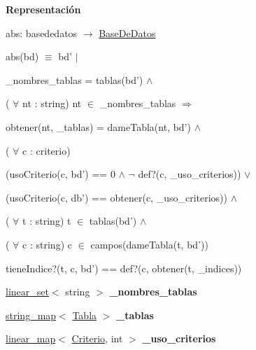 \begin{Indent}{\bf Representación}
{abs\-: basededatos $\to$ \hyperlink{classBaseDeDatos}{Base\-De\-Datos}\par
abs(bd) $\equiv$ bd' $|$
\begin{DoxyItemize}
\item \-\_\-nombres\-\_\-tablas = tablas(bd') $\land$
\item ( $\forall$ nt \-: string) nt $\in$ \-\_\-nombres\-\_\-tablas $\Rightarrow$
\begin{DoxyItemize}
\item obtener(nt, \-\_\-tablas) = dame\-Tabla(nt, bd') $\land$
\end{DoxyItemize}
\item ( $\forall$ c \-: criterio)
\begin{DoxyItemize}
\item (uso\-Criterio(c, bd') == 0 $\land$ $\lnot$ def?(c, \-\_\-uso\-\_\-criterios)) $\lor$
\item (uso\-Criterio(c, db') == obtener(c, \-\_\-uso\-\_\-criterios)) $\land$
\end{DoxyItemize}
\item ( $\forall$ t \-: string) t $\in$ tablas(bd') $\land$
\item ( $\forall$ c \-: string) c $\in$ campos(dame\-Tabla(t, bd'))
\begin{DoxyItemize}
\item tiene\-Indice?(t, c, bd') == def?(c, obtener(t, \-\_\-indices)) 
\end{DoxyItemize}
\end{DoxyItemize}}\begin{DoxyCompactItemize}
\item 
\hypertarget{classBaseDeDatos_ae93f3d0a8d138e5742c52b9f2294d2bd}{\hyperlink{classlinear__set}{linear\-\_\-set}$<$ string $>$ {\bfseries \-\_\-nombres\-\_\-tablas}}\label{classBaseDeDatos_ae93f3d0a8d138e5742c52b9f2294d2bd}

\item 
\hypertarget{classBaseDeDatos_a4dfd166b7a61aef87421b7d58db9bb05}{\hyperlink{classstring__map}{string\-\_\-map}$<$ \hyperlink{classTabla}{Tabla} $>$ {\bfseries \-\_\-tablas}}\label{classBaseDeDatos_a4dfd166b7a61aef87421b7d58db9bb05}

\item 
\hypertarget{classBaseDeDatos_acc03ee648f19ad950d399861cc263a30}{\hyperlink{classlinear__map}{linear\-\_\-map}$<$ \hyperlink{classBaseDeDatos_a6742a222e87623bc92a810a693fb337b}{Criterio}, int $>$ {\bfseries \-\_\-uso\-\_\-criterios}}\label{classBaseDeDatos_acc03ee648f19ad950d399861cc263a30}


\end{DoxyCompactItemize}
\end{Indent}
